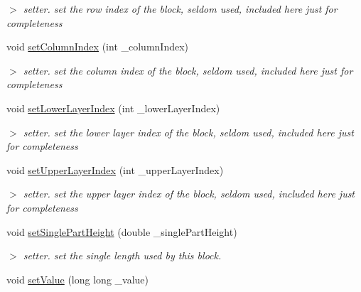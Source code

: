\begin{DoxyCompactItemize}
\begin{DoxyCompactList}\small\item\em $>$ setter. set the row index of the block, seldom used, included here just for completeness \end{DoxyCompactList}\item 
\hypertarget{classBlock_aa7baf345a2178c30b77b2e4c92f2bd87}{void \hyperlink{classBlock_aa7baf345a2178c30b77b2e4c92f2bd87}{set\-Column\-Index} (int \-\_\-column\-Index)}\label{classBlock_aa7baf345a2178c30b77b2e4c92f2bd87}

\begin{DoxyCompactList}\small\item\em $>$ setter. set the column index of the block, seldom used, included here just for completeness \end{DoxyCompactList}\item 
\hypertarget{classBlock_a8c2e66acf65d4621369e68764bd16878}{void \hyperlink{classBlock_a8c2e66acf65d4621369e68764bd16878}{set\-Lower\-Layer\-Index} (int \-\_\-lower\-Layer\-Index)}\label{classBlock_a8c2e66acf65d4621369e68764bd16878}

\begin{DoxyCompactList}\small\item\em $>$ setter. set the lower layer index of the block, seldom used, included here just for completeness \end{DoxyCompactList}\item 
\hypertarget{classBlock_a0acbd3f89758131aa40fe0fa534f0bf8}{void \hyperlink{classBlock_a0acbd3f89758131aa40fe0fa534f0bf8}{set\-Upper\-Layer\-Index} (int \-\_\-upper\-Layer\-Index)}\label{classBlock_a0acbd3f89758131aa40fe0fa534f0bf8}

\begin{DoxyCompactList}\small\item\em $>$ setter. set the upper layer index of the block, seldom used, included here just for completeness \end{DoxyCompactList}\item 
\hypertarget{classBlock_a54819ef3e2f9c5e5529459b8cc100ebf}{void \hyperlink{classBlock_a54819ef3e2f9c5e5529459b8cc100ebf}{set\-Single\-Part\-Height} (double \-\_\-single\-Part\-Height)}\label{classBlock_a54819ef3e2f9c5e5529459b8cc100ebf}

\begin{DoxyCompactList}\small\item\em $>$ setter. set the single length used by this block. \end{DoxyCompactList}\item 
\hypertarget{classBlock_a0dbbe029ff3a2b1eba2bf2c72c6e24f8}{void \hyperlink{classBlock_a0dbbe029ff3a2b1eba2bf2c72c6e24f8}{set\-Value} (long long \-\_\-value)}\label{classBlock_a0dbbe029ff3a2b1eba2bf2c72c6e24f8}


\end{DoxyCompactItemize}
